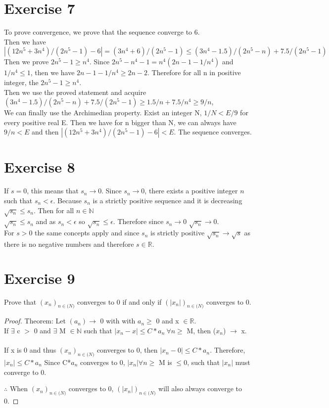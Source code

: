 \documentclass[12pt]{article}
\providecommand{\abs}[1]{\lvert #1 \rvert}
\theoremstyle{definition}
\numberwithin{equation}{subsection}
\begin{document}
\section{Exercise 7}
To prove convergence, we prove that the sequence converge to 6.
\\Then we have $|(12n^5+3n^4)/(2n^5-1)-6|=(3n^4+6)/(2n^5-1) \leqslant (3n^4-1.5)/(2n^5-n) + 7.5/(2n^5-1)$
\\Then we prove $2n^5-1 \geq n^4$. Since $2n^5-n^4-1=n^4(2n-1-1/n^4)$ and $1/n^4 \leqslant 1$, then we have  $2n-1-1/n^4 \geq 2n-2$. Therefore for all n in positive integer, the $2n^5-1 \geq n^4$. 
\\ Then we use the proved statement and acquire $(3n^4-1.5)/(2n^5-n) + 7.5/(2n^5-1) \geq 1.5/n +7.5/n^4 \geq 9/n $,
\\We can finally use the Archimedian property. Exist an integer N, $1/N < E/9 $ for every positive real E.
Then we have for n bigger than N, we can always have $9/n < E$ and then $|(12n^5+3n^4)/(2n^5-1)-6| < E$. The sequence converges.  
\section{Exercise 8}

If $s = 0$, this means that $s_n \to 0$. Since $s_n \to 0$, there exists a positive integer $n$ such that $s_n < \epsilon$. Because $s_n$ is a strictly positive sequence and it is decreasing $\sqrt{s_n} \leq s_n$. Then for all $n \in \mathbb{N}$ 
\\
$\sqrt{s_n} \leq s_n$ and as $s_n < \epsilon$ so $\sqrt{s_n} \leq \epsilon$. Therefore since $s_n \to 0$ $\sqrt{s_n} \to 0$.
\\
For $s > 0$ the same concepts apply and since $s_n$ is strictly positive $\sqrt{s_n} \to \sqrt{s}$ as there is no negative numbers and therefore $s \in \mathbb{R}$. 

\section{Exercise 9}
Prove that $(x_n)_{n\in \mathbb(N)}$ converges to 0 if and only if $(\abs{x_n})_{n\in \mathbb(N)}$ converges to 0.

\begin{proof}
Theorem: Let $(a_n) \to$ 0 with with $a_n \geq$ 0 and x $\in \mathbb{R}$.
\\ If $\exists$ c $>$ 0 and $\exists$ M $\in \mathbb{N}$ such that $\abs{x_n - x} \leq C*a_n \ \forall n \geq$ M, then ($x_n$) $\to$ x. \\ \\

If x is 0 and thus $(x_n)_{n\in \mathbb(N)}$ converges to 0, then $\abs{x_n - 0} \leq C*a_n$.
Therefore, $\abs{x_n} \leq C*a_n$
Since C*$a_n$ converges to 0, $\abs{x_n} \forall n \geq$ M is $\leq 0$, such that $\abs{x_n}$ must converge to 0.

$\therefore$ When $(x_n)_{n\in \mathbb(N)}$ converges to 0, $(\abs{x_n})_{n\in \mathbb(N)}$ will also always converge to 0.

\end{proof}
\end{document}
